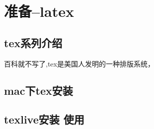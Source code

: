 \section{准备--latex}
\subsection{tex系列介绍}
百科就不写了,tex是美国人发明的一种排版系统，
\subsection{mac下tex安装}
\subsection{texlive安装 使用}






